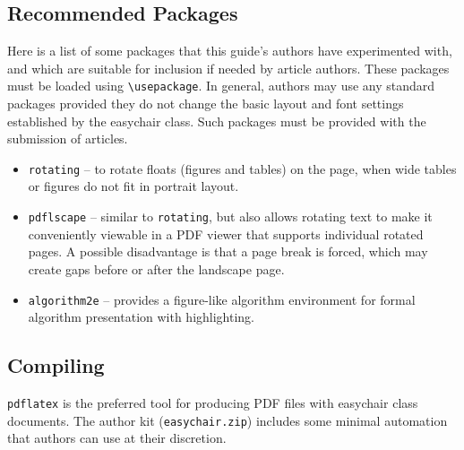 \documentclass{imav2013}
\newcommand{\easychair}{\textsf{easychair}}
\begin{document}
\subsection{Recommended Packages}
\label{sect:recommended-packages}

Here is a list of some packages that this guide's authors have experimented 
with, and which are suitable for inclusion if needed by article authors.
These packages must be loaded using \verb+\usepackage+.
In general, authors may use any standard packages provided they do not change
the basic layout and font settings established by the {\easychair} class.
Such packages must be provided with the submission of articles.

\begin{itemize}
\item
\texttt{rotating} \cite{rotating-package} -- to rotate floats (figures and
tables) on the page, when wide tables or figures do not fit in portrait layout.

\item
\texttt{pdflscape} \cite{pdflscape-package} -- similar to \texttt{rotating}, 
but also allows rotating text to make it conveniently viewable in a PDF 
viewer that supports individual rotated pages.
A possible disadvantage is that a page break is forced, which may create
gaps before or after the landscape page.

\item
\texttt{algorithm2e} \cite{algorithm2e-package} -- provides a figure-like
algorithm environment for formal algorithm presentation with highlighting.

\end{itemize}

\subsection{Compiling}
\label{sect:compiling}

\texttt{pdflatex} \cite{pdflatex-instructions} is the preferred tool for
producing PDF files with {\easychair} class documents.
The author kit (\texttt{easychair.zip}) includes some minimal automation 
that authors can use at their discretion.
\end{document}
